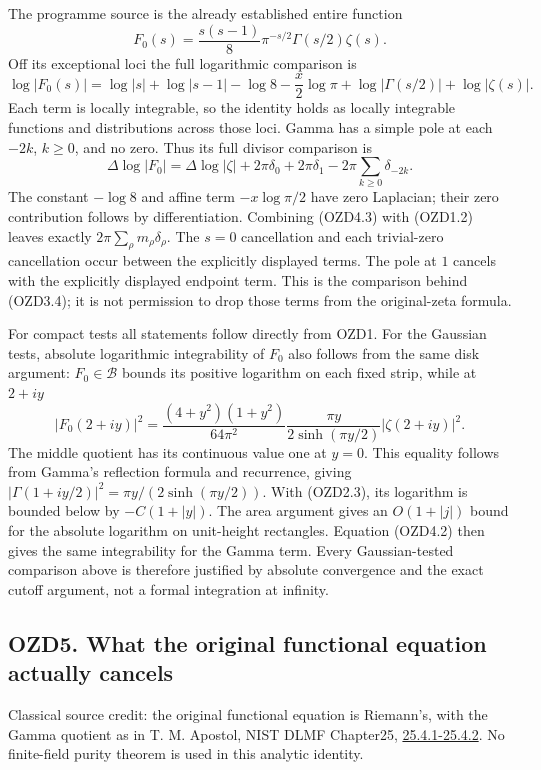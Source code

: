 The programme source is the already established entire function \[
F_0(s)=\frac{s(s-1)}8\pi^{-s/2}\Gamma(s/2)\zeta(s).
\tag{OZD4.1}
\] Off its exceptional loci the full logarithmic comparison is \[
\log|F_0(s)|=\log|s|+\log|s-1|-\log8
-\frac{x}{2}\log\pi+\log|\Gamma(s/2)|+\log|\zeta(s)|.
\tag{OZD4.2}
\] Each term is locally integrable, so the identity holds as locally
integrable functions and distributions across those loci. Gamma has a
simple pole at each \(-2k\), \(k\ge0\), and no zero. Thus its full
divisor comparison is \[
\Delta\log|F_0|=\Delta\log|\zeta|
+2\pi\delta_0+2\pi\delta_1
-2\pi\sum_{k\ge0}\delta_{-2k}.
\tag{OZD4.3}
\] The constant \(-\log8\) and affine term \(-x\log\pi/2\) have zero
Laplacian; their zero contribution follows by differentiation. Combining
(OZD4.3) with (OZD1.2) leaves exactly
\(2\pi\sum_\rho m_\rho\delta_\rho\). The \(s=0\) cancellation and each
trivial-zero cancellation occur between the explicitly displayed terms.
The pole at \(1\) cancels with the explicitly displayed endpoint term.
This is the comparison behind (OZD3.4); it is not permission to drop
those terms from the original-zeta formula.

For compact tests all statements follow directly from OZD1. For the
Gaussian tests, absolute logarithmic integrability of \(F_0\) also
follows from the same disk argument: \(F_0\in\mathcal B\) bounds its
positive logarithm on each fixed strip, while at \(2+iy\) \[
|F_0(2+iy)|^2=
\frac{(4+y^2)(1+y^2)}{64\pi^2}
\frac{\pi y}{2\sinh(\pi y/2)}|\zeta(2+iy)|^2.
\tag{OZD4.4}
\] The middle quotient has its continuous value one at \(y=0\). This
equality follows from Gamma's reflection formula and recurrence, giving
\(|\Gamma(1+iy/2)|^2=\pi y/(2\sinh(\pi y/2))\). With (OZD2.3), its
logarithm is bounded below by \(-C(1+|y|)\). The area argument gives an
\(O(1+|j|)\) bound for the absolute logarithm on unit-height rectangles.
Equation (OZD4.2) then gives the same integrability for the Gamma term.
Every Gaussian-tested comparison above is therefore justified by
absolute convergence and the exact cutoff argument, not a formal
integration at infinity.

\subsection{OZD5. What the original functional equation actually
cancels}\label{ozd5.-what-the-original-functional-equation-actually-cancels}

Classical source credit: the original functional equation is Riemann's,
with the Gamma quotient as in T. M. Apostol, NIST DLMF Chapter25,
\href{https://dlmf.nist.gov/25.4}{25.4.1-25.4.2}. No finite-field purity
theorem is used in this analytic identity.

